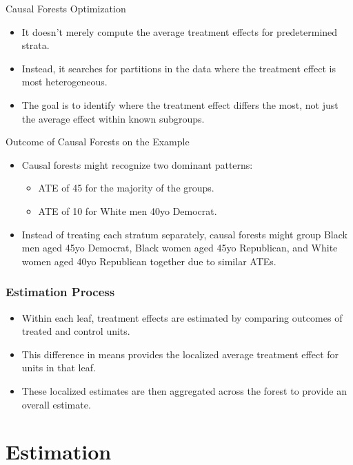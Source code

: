\documentclass{beamer}
\begin{document}
\begin{frame}{Causal Forests Optimization}
\begin{itemize}
    \item It doesn't merely compute the average treatment effects for predetermined strata.
    \item Instead, it searches for partitions in the data where the treatment effect is most heterogeneous.
    \item The goal is to identify where the treatment effect differs the most, not just the average effect within known subgroups.
\end{itemize}
\end{frame}


\begin{frame}{Outcome of Causal Forests on the Example}
\begin{itemize}
    \item Causal forests might recognize two dominant patterns:
    \begin{itemize}
        \item ATE of 45 for the majority of the groups.
        \item ATE of 10 for White men 40yo Democrat.
    \end{itemize}
    \item Instead of treating each stratum separately, causal forests might group Black men aged 45yo Democrat, Black women aged 45yo Republican, and White women aged 40yo Republican together due to similar ATEs.
\end{itemize}
\end{frame}

\begin{frame}
\frametitle{Estimation Process}
\begin{itemize}
    \item Within each leaf, treatment effects are estimated by comparing outcomes of treated and control units.
    \item This difference in means provides the localized average treatment effect for units in that leaf.
    \item These localized estimates are then aggregated across the forest to provide an overall estimate.
\end{itemize}
\end{frame}








\section{Estimation}
\end{document}

